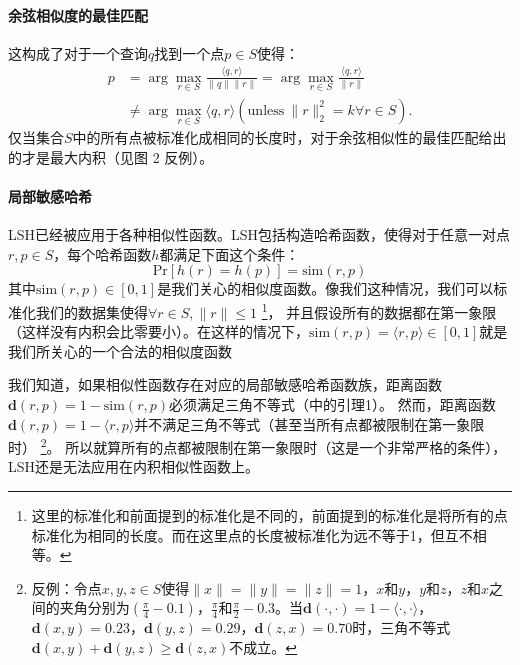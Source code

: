\documentclass[twocolumn]{article}
\begin{document}
\paragraph{余弦相似度的最佳匹配}这构成了对于一个查询$q$找到一个点$p \in S$使得：
\begin{align*}
p &= \arg \max_{r \in S} \frac{\langle q,r \rangle}{\|q\|\|r\|} = \arg \max_{r \in S} \frac{\langle q,r \rangle}{\|r\|} \\
    &\neq \arg \max_{r \in S} \langle q,r \rangle (\mathrm{unless}\ \|r\|_2^2 = k \forall r \in S).
\end{align*}
仅当集合$S$中的所有点被标准化成相同的长度时，对于余弦相似性的最佳匹配给出的才是最大内积（见图 2 反例）。

\paragraph{局部敏感哈希}LSH已经被应用于各种相似性函数。LSH包括构造哈希函数，使得对于任意一对点$r,p \in S$，每个哈希函数$h$都满足下面这个条件：
\begin{equation}
\mathrm{Pr}[h(r) = h(p)] = \mathrm{sim}(r,p)
\end{equation}
其中$\mathrm{sim}(r,p) \in [0,1]$是我们关心的相似度函数。像我们这种情况，我们可以标准化我们的数据集使得$\forall r \in S, \|r\| \le 1$
\footnote{这里的标准化和前面提到的标准化是不同的，前面提到的标准化是将所有的点标准化为相同的长度。而在这里点的长度被标准化为远不等于1，但互不相等。}，
并且假设所有的数据都在第一象限（这样没有内积会比零要小）。在这样的情况下，$\mathrm{sim}(r,p) = \langle r,p \rangle \in [0,1]$就是我们所关心的一个合法的相似度函数

我们知道，如果相似性函数存在对应的局部敏感哈希函数族，距离函数$\mathbf{d}(r,p) = 1 - \mathrm{sim}(r,p)$必须满足三角不等式（\cite{7}中的引理1）。
然而，距离函数$\mathbf{d}(r, p) = 1 - \langle r,p \rangle$并不满足三角不等式（甚至当所有点都被限制在第一象限时）
\footnote{反例：令点$x,y,z\in S$使得$\|x\|=\|y\|=\|z\|=1$，$x$和$y$，$y$和$z$，$z$和$x$之间的夹角分别为$\left(\frac{\pi}{4} - 0.1\right)$，$\frac{\pi}{4}$和$\frac{\pi}{2} - 0.3$。当$\mathbf{d}(\cdot,\cdot)=1-\langle \cdot,\cdot \rangle$，$\mathbf{d}(x,y) = 0.23$，$\mathbf{d}(y,z)=0.29$，$\mathbf{d}(z,x)=0.70$时，三角不等式$\mathbf{d}(x,y)+\mathbf{d}(y,z)\ge\mathbf{d}(z,x)$不成立。}。
所以就算所有的点都被限制在第一象限时（这是一个非常严格的条件），LSH还是无法应用在内积相似性函数上。
\end{document}
